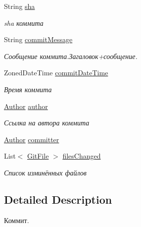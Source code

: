 \begin{DoxyCompactItemize}
\item 
String \hyperlink{classcom_1_1selesse_1_1gitwrapper_1_1myobjects_1_1_commit_a0922f957c3a176404df5610c4922eb93}{sha}
\begin{DoxyCompactList}\small\item\em sha коммита \end{DoxyCompactList}\item 
String \hyperlink{classcom_1_1selesse_1_1gitwrapper_1_1myobjects_1_1_commit_a54013a7145d48c39c9bde8b96bc1ba00}{commit\+Message}
\begin{DoxyCompactList}\small\item\em Сообщение коммита.\+Загаловок+сообщение. \end{DoxyCompactList}\item 
Zoned\+Date\+Time \hyperlink{classcom_1_1selesse_1_1gitwrapper_1_1myobjects_1_1_commit_a8432dcda5824fb1ec915cf58c97e55e6}{commit\+Date\+Time}
\begin{DoxyCompactList}\small\item\em Время коммита \end{DoxyCompactList}\item 
\hyperlink{classcom_1_1selesse_1_1gitwrapper_1_1myobjects_1_1_author}{Author} \hyperlink{classcom_1_1selesse_1_1gitwrapper_1_1myobjects_1_1_commit_ac3bb0d4518fc2b0e7c59190f68639482}{author}
\begin{DoxyCompactList}\small\item\em Ссылка на автора коммита \end{DoxyCompactList}\item 
\hyperlink{classcom_1_1selesse_1_1gitwrapper_1_1myobjects_1_1_author}{Author} \hyperlink{classcom_1_1selesse_1_1gitwrapper_1_1myobjects_1_1_commit_a1da6ac2512ea029bcb33054d18dcbf33}{committer}
\item 
List$<$ \hyperlink{classcom_1_1selesse_1_1gitwrapper_1_1myobjects_1_1_git_file}{Git\+File} $>$ \hyperlink{classcom_1_1selesse_1_1gitwrapper_1_1myobjects_1_1_commit_a4e94c2e615e45c49cde7814aa2ecdd7e}{files\+Changed}
\begin{DoxyCompactList}\small\item\em Список изминённых файлов \end{DoxyCompactList}\end{DoxyCompactItemize}


\subsection{Detailed Description}
Коммит. 

